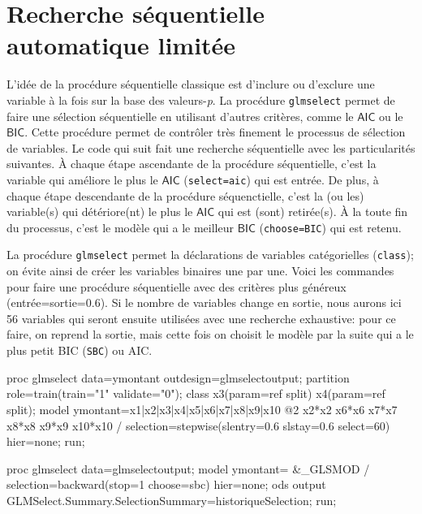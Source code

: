 \documentclass[
  11pt,
  letterpaper,
]{book}
\newenvironment{Shaded}{\begin{snugshade}}{\end{snugshade}}
\newcommand{\NormalTok}[1]{#1}
\theoremstyle{definition}
\theoremstyle{definition}
\theoremstyle{definition}
\theoremstyle{definition}
\theoremstyle{remark}
\begin{document}
\hypertarget{recherche-suxe9quentielle-automatique-limituxe9e}{%
\section{Recherche séquentielle automatique limitée}\label{recherche-suxe9quentielle-automatique-limituxe9e}}

L'idée de la procédure séquentielle classique est d'inclure ou d'exclure une variable à la fois sur la base des valeurs-\emph{p}. La procédure \texttt{glmselect} permet de faire une sélection séquentielle en utilisant d'autres critères, comme le \(\mathsf{AIC}\) ou le \(\mathsf{BIC}\). Cette procédure permet de contrôler très finement le processus de sélection de variables. Le code qui suit fait une recherche séquentielle avec les particularités suivantes. À chaque étape ascendante de la procédure séquentielle, c'est la variable qui améliore le plus le \(\mathsf{AIC}\) (\texttt{select=aic}) qui est entrée. De plus, à chaque étape descendante de la procédure séquenctielle, c'est la (ou les) variable(s) qui détériore(nt) le plus le \(\mathsf{AIC}\) qui est (sont) retirée(s). À la toute fin du processus, c'est le modèle qui a le meilleur \(\mathsf{BIC}\) (\texttt{choose=BIC}) qui est retenu.

La procédure \texttt{glmselect} permet la déclarations de variables catégorielles (\texttt{class}); on évite ainsi de créer les variables binaires une par une. Voici les commandes pour faire une procédure séquentielle avec des critères plus généreux (entrée=sortie=0.6). Si le nombre de variables change en sortie, nous aurons ici 56 variables qui seront ensuite utilisées avec une recherche exhaustive: pour ce faire, on reprend la sortie, mais cette fois on choisit le modèle par la suite qui a le plus petit BIC (\texttt{SBC}) ou AIC.

\begin{Shaded}
\begin{Highlighting}[]
\NormalTok{ proc glmselect data=ymontant outdesign=glmselectoutput;}
\NormalTok{ partition role=train(train="1" validate="0");}
\NormalTok{ class x3(param=ref split) x4(param=ref split);}
\NormalTok{ model ymontant=x1|x2|x3|x4|x5|x6|x7|x8|x9|x10 @2}
\NormalTok{ x2*x2 x6*x6 x7*x7 x8*x8 x9*x9 x10*x10 /  }
\NormalTok{ selection=stepwise(slentry=0.6 slstay=0.6 select=60) hier=none;}
\NormalTok{ run;}

\NormalTok{ proc glmselect data=glmselectoutput;}
\NormalTok{ model ymontant= \&\_GLSMOD / }
\NormalTok{ selection=backward(stop=1 choose=sbc) hier=none;}
\NormalTok{ ods output GLMSelect.Summary.SelectionSummary=historiqueSelection;}
\NormalTok{ run;}
\end{Highlighting}
\end{Shaded}
\end{document}
